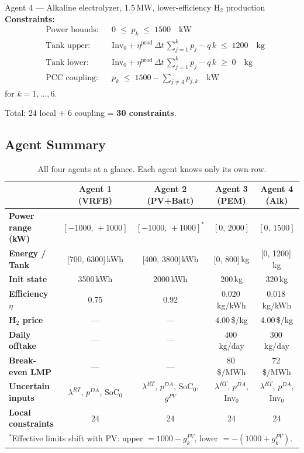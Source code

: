 \documentclass[11pt, letterpaper]{article}
\newcommand{\Dt}{\Delta t}
\begin{document}
\begin{agentbox}{Agent 4 — Alkaline electrolyzer, 1.5\,MW, lower-efficiency H$_2$ production}
\textbf{Constraints:}
\begin{align*}
  &\text{Power bounds:}     && 0 \;\le\; p_k \;\le\; 1500 \quad\text{kW} \\
  &\text{Tank upper:}       && \text{Inv}_0 + \eta^{\text{prod}}\,\Dt\,\textstyle\sum_{j=1}^k p_j - q\,k \;\le\; 1200 \quad\text{kg} \\
  &\text{Tank lower:}       && \text{Inv}_0 + \eta^{\text{prod}}\,\Dt\,\textstyle\sum_{j=1}^k p_j - q\,k \;\ge\; 0    \quad\text{kg} \\
  &\text{PCC coupling:}     && p_k \;\le\; 1500 - \textstyle\sum_{j\ne 4} p_{j,k} \quad\text{kW}
\end{align*}
for $k = 1,\ldots,6$.

Total: 24 local + 6 coupling = \textbf{30 constraints}.

\end{agentbox}

\subsection{Agent Summary}

\begin{table}[H]
\centering
\caption{All four agents at a glance.  Each agent knows only its own row.}
\label{tab:agent_summary}
\small
\begin{tabular}{l|cccc}
\toprule
 & Agent 1 (VRFB) & Agent 2 (PV+Batt) & Agent 3 (PEM) & Agent 4 (Alk) \\
\midrule
\textbf{Power range (kW)} & $[-1000,\,+1000]$ & $[-1000,\,+1000]^{*}$ & $[0,\,2000]$ & $[0,\,1500]$ \\
\textbf{Energy / Tank}    & [700, 6300]\,kWh & [400, 3800]\,kWh & [0, 800]\,kg & [0, 1200]\,kg \\
\textbf{Init state}       & 3500\,kWh & 2000\,kWh & 200\,kg & 320\,kg \\
\textbf{Efficiency $\eta$} & 0.75 & 0.92 & 0.020\,kg/kWh & 0.018\,kg/kWh \\
\textbf{H$_2$ price}      & — & — & 4.00\,\$/kg & 4.00\,\$/kg \\
\textbf{Daily offtake}    & — & — & 400\,kg/day & 300\,kg/day \\
\textbf{Break-even LMP}   & — & — & 80\,\$/MWh & 72\,\$/MWh \\
\textbf{Uncertain inputs} & $\lambda^{RT}$, $p^{DA}$, SoC$_0$ & $\lambda^{RT}$, $p^{DA}$, SoC$_0$, $g^{PV}$ & $\lambda^{RT}$, $p^{DA}$, Inv$_0$ & $\lambda^{RT}$, $p^{DA}$, Inv$_0$ \\
\textbf{Local constraints} & 24 & 24 & 24 & 24 \\
\bottomrule
\multicolumn{5}{l}{$^*$Effective limits shift with PV: upper $= 1000 - g^{PV}_k$, lower $= -(1000 + g^{PV}_k)$.}
\end{tabular}
\end{table}
\end{document}
